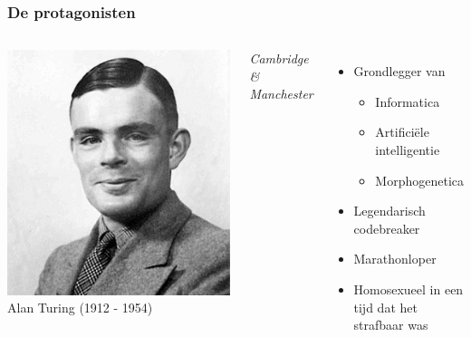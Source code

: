 \documentclass[handout]{beamer}
\begin{document}
\begin{frame}
    \frametitle{De protagonisten}
    \begin{columns}
        \includegraphics[width=\textwidth]{Turing.jpg}
        {\Large Alan Turing} (1912 - 1954) 

        \emph{Cambridge \& Manchester}
        \begin{itemize}
            \item Grondlegger van
            \begin{itemize}
                \item<2-> Informatica
                \item<3-> Artificiële intelligentie
                \item<4-> Morphogenetica
            \end{itemize}
            \item<5-> Legendarisch codebreaker
            \item<6-> Marathonloper
            \item<7-> Homosexueel in een tijd dat het strafbaar was
        \end{itemize}    
    \end{columns}
\end{frame}
\end{document}
